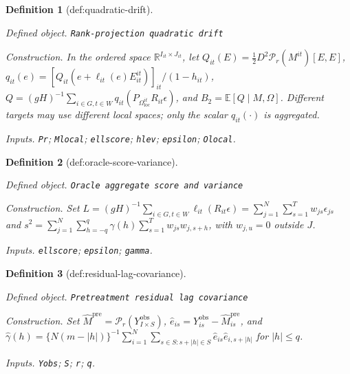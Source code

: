\documentclass{article}
\newtheorem{definition}{Definition}
\begin{document}
\begin{definition}[def:quadratic-drift]\label{def:quadratic-drift}
\par\smallskip\noindent\emph{Defined object.} \texttt{Rank-\allowbreak{}projection quadratic drift}
\par\smallskip\noindent\emph{Construction.} In the ordered space \(\mathbb R^{I_{it}\times J_{it}}\), let \(Q_{it}(E)=\tfrac12D^2\mathcal P_r(M^{it})[E,E]\), \(q_{it}(e)=[Q_{it}(e+\ell_{it}(e)E^{it}_{it})]_{it}/(1-h_{it})\), \(Q=(gH)^{-1}\sum_{i\in G,t\in W}q_{it}(P_{\Omega_{\mathrm{loc}}^{it}}R_{it}\epsilon)\), and \(B_2=\mathbb E[Q\mid M,\Omega]\). Different targets may use different local spaces; only the scalar \(q_{it}(\cdot)\) is aggregated.
\par\smallskip\noindent\emph{Inputs.} \texttt{Pr}; \texttt{Mlocal}; \texttt{ellscore}; \texttt{hlev}; \texttt{epsilon}; \texttt{Olocal}.
\end{definition}

\begin{definition}[def:oracle-score-variance]\label{def:oracle-score-variance}
\par\smallskip\noindent\emph{Defined object.} \texttt{Oracle aggregate score and variance}
\par\smallskip\noindent\emph{Construction.} Set \(L=(gH)^{-1}\sum_{i\in G,t\in W}\ell_{it}(R_{it}\epsilon)=\sum_{j=1}^N\sum_{s=1}^T w_{js}\epsilon_{js}\) and \(s^2=\sum_{j=1}^N\sum_{h=-q}^q\gamma(h)\sum_{s=1}^T w_{js}w_{j,s+h}\), with \(w_{j,u}=0\) outside \(J\).
\par\smallskip\noindent\emph{Inputs.} \texttt{ellscore}; \texttt{epsilon}; \texttt{gamma}.
\end{definition}

\begin{definition}[def:residual-lag-covariance]\label{def:residual-lag-covariance}
\par\smallskip\noindent\emph{Defined object.} \texttt{Pretreatment residual lag covariance}
\par\smallskip\noindent\emph{Construction.} Set \(\widehat M^{\mathrm{pre}}=\mathcal P_r(Y^{\mathrm{obs}}_{I\times S})\), \(\widehat e_{is}=Y^{\mathrm{obs}}_{is}-\widehat M^{\mathrm{pre}}_{is}\), and \(\widehat\gamma(h)=\{N(m-|h|)\}^{-1}\sum_{i=1}^N\sum_{s\in S:s+|h|\in S}\widehat e_{is}\widehat e_{i,s+|h|}\) for \(|h|\le q\).
\par\smallskip\noindent\emph{Inputs.} \texttt{Yobs}; \texttt{S}; \texttt{r}; \texttt{q}.
\end{definition}
\end{document}
